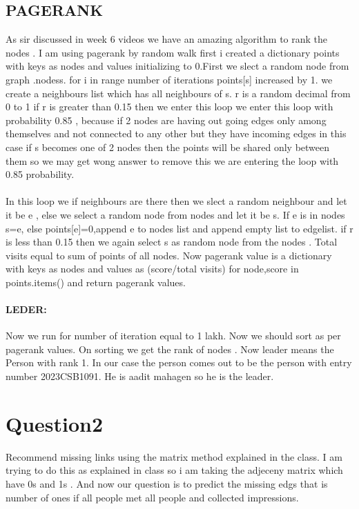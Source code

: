 \documentclass{article}
\begin{document}
\subsection{PAGERANK}
As sir discussed in week 6 videos we have an amazing algorithm to rank the nodes . I am using pagerank by random walk first i created a dictionary points with keys as nodes and values initializing to 0.First we slect a random node from graph .nodess. for i in range number of iterations 
points[s] increased by 1. we create a neighbours list which has all neighbours of s. r is a random decimal from 0 to 1 if r is greater than 0.15 then we enter this loop we enter this loop with probability 0.85 , because if 2 nodes are having out going  edges only among themselves and not connected to any other but they have incoming edges in this case if s becomes one of 2 nodes then the points will be shared only between them so we may get wong answer to remove this we are entering the loop with 0.85 probability.

\paragraph{}
In this loop we if neighbours are there then we slect a random neighbour and let it be e , else we select a random node from nodes and let it be s. If e is in nodes s=e, else points[e]=0,append e to nodes list and append empty list to edgelist. if r is less than 0.15 then we again select s as random node from the nodes . Total visits equal to sum of points of all nodes. Now pagerank value is a dictionary with keys as nodes and values as (score/total visits) for node,score in points.items() and return pagerank values.
\paragraph{LEDER:}

Now we run for number of iteration equal to 1 lakh. Now we should sort as per pagerank values. On sorting we get the rank of nodes . Now leader means the Person with rank 1. In our case the person comes out to be the person with  entry number 2023CSB1091. He is aadit mahagen so he is the leader.

\newpage
\section{Question2}
Recommend missing links using the matrix method explained in the class. I am trying to do this as explained in class so i am taking the adjeceny matrix which have 0s and 1s . And now our question is to predict the missing edgs that is number of ones if all people met all people and collected impressions.
\end{document}
